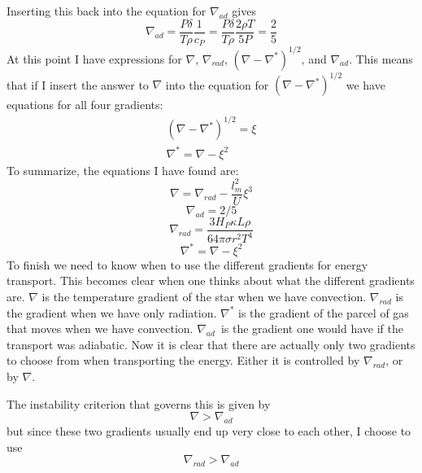 \documentclass[a4paper,12pt]{article}
\begin{document}
Inserting this back into the equation for $\nabla_{ad}$ gives
\begin{equation}
 \nabla_{ad} = \frac{P\delta}{T\rho}\frac{1}{c_P} = \frac{P\delta}{T\rho}\frac{2\rho T}{5P} = \frac{2}{5}
\end{equation}
At this point I have expressions for $\nabla$, $\nabla_{rad}$,  $(\nabla - \nabla^*)^{1/2}$, and $\nabla_{ad}$.
This means that if I insert the answer to $\nabla$ into the equation for $(\nabla - \nabla^*)^{1/2}$ we have equations for all four gradients:
\begin{equation}
\begin{aligned}
 (\nabla - \nabla^*)^{1/2} = \xi\\
\nabla^* = \nabla- \xi^2 
\end{aligned}
\end{equation}
To summarize, the equations I have found are:
\begin{equation}
\nabla = \nabla_{rad} - \frac{l_m^2}{U} \xi^3
\end{equation}
\begin{equation}
\nabla_{ad} = 2/5
\end{equation}
\begin{equation}
\nabla_{rad} = \frac{3H_P\kappa L\rho}{64\pi\sigma r^2 T^4}
\end{equation}
\begin{equation}
\nabla^* = \nabla- \xi^2 
\end{equation}
To finish we need to know when to use the different gradients for energy transport.
This becomes clear when one thinks about what the different gradients are.
$\nabla$ is the temperature gradient of the star when we have convection.
$\nabla_{rad}$ is the gradient when we have only radiation.
$\nabla^*$ is the gradient of the parcel of gas that moves when we have convection.
$\nabla_{ad}$ is the gradient one would have if the transport was adiabatic.
Now it is clear that there are actually only two gradients to choose from when transporting the energy.
Either it is controlled by $\nabla_{rad}$, or by $\nabla$.

The instability criterion that governs this is given by
\begin{equation}
 \nabla > \nabla_{ad}
 \label{nabla-nabla_ad}
\end{equation}
but since these two gradients usually end up very close to each other, I choose to use
\begin{equation}
 \nabla_{rad} > \nabla_{ad}
 \label{nabla_rad-nabla_ad}
\end{equation}
\end{document}
